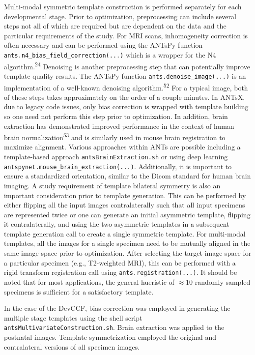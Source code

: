 \documentclass[
  12pt,
]{article}
\begin{document}
Multi-modal symmetric template construction is performed separately for
each developmental stage. Prior to optimization, preprocessing can
include several steps not all of which are required but are dependent on
the data and the particular requirements of the study. For MRI scans,
inhomogeneity correction is often necessary and can be performed using
the ANTsPy function \texttt{ants.n4\_bias\_field\_correction(...)} which
is a wrapper for the N4 algorithm.\textsuperscript{24} Denoising is
another preprocessing step that can potentially improve template quality
results. The ANTsPy function \texttt{ants.denoise\_image(...)} is an
implementation of a well-known denoising algorithm.\textsuperscript{52}
For a typical image, both of these steps takes approximately on the
order of a couple minutes. In ANTsX, due to legacy code issues, only
bias correction is wrapped with template building so one need not
perform this step prior to optimization. In addition, brain extraction
has demonstrated improved performance in the context of human brain
normalization\textsuperscript{53} and is similarly used in mouse brain
registration to maximize alignment. Various approaches within ANTs are
possible including a template-based approach
\texttt{antsBrainExtraction.sh} or using deep learning
\texttt{antspynet.mouse\_brain\_extraction(...)}. Additionally, it is
important to ensure a standardized orientation, similar to the Dicom
standard for human brain imaging. A study requirement of template
bilateral symmetry is also an important consideration prior to template
generation. This can be performed by either flipping all the input
images contralaterally such that all input specimens are represented
twice or one can generate an initial asymmetric template, flipping it
contralaterally, and using the two asymmetric templates in a subsequent
template generation call to create a single symmetric template. For
multi-modal templates, all the images for a single specimen need to be
mutually aligned in the same image space prior to optimization. After
selecting the target image space for a particular specimen (e.g.,
T2-weighted MRI), this can be performed with a rigid transform
registration call using \texttt{ants.registration(...)}. It should be
noted that for most applications, the general hueristic of
\(\approx 10\) randomly sampled specimens is sufficient for a
satisfactory template.

In the case of the DevCCF, bias correction was employed in generating
the multiple stage templates using the shell script
\texttt{antsMultivariateConstruction.sh}. Brain extraction was applied
to the postnatal images. Template symmetrization employed the original
and contralateral versions of all specimen images.
\end{document}
